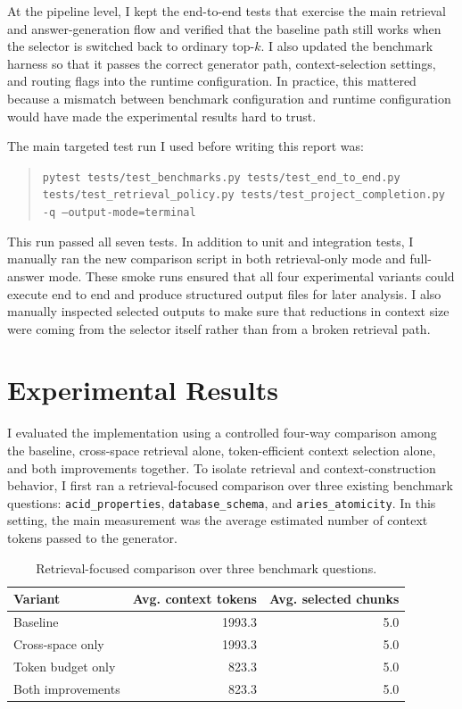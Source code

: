 \documentclass[10pt,twocolumn]{article}
\begin{document}
At the pipeline level, I kept the end-to-end tests that exercise the main retrieval and answer-generation flow and verified that the baseline path still works when the selector is switched back to ordinary top-$k$. I also updated the benchmark harness so that it passes the correct generator path, context-selection settings, and routing flags into the runtime configuration. In practice, this mattered because a mismatch between benchmark configuration and runtime configuration would have made the experimental results hard to trust.

The main targeted test run I used before writing this report was:
\begin{quote}\small
\texttt{pytest tests/test\_benchmarks.py tests/test\_end\_to\_end.py tests/test\_retrieval\_policy.py tests/test\_project\_completion.py -q --output-mode=terminal}
\end{quote}
This run passed all seven tests. In addition to unit and integration tests, I manually ran the new comparison script in both retrieval-only mode and full-answer mode. These smoke runs ensured that all four experimental variants could execute end to end and produce structured output files for later analysis. I also manually inspected selected outputs to make sure that reductions in context size were coming from the selector itself rather than from a broken retrieval path.

\section*{Experimental Results}
I evaluated the implementation using a controlled four-way comparison among the baseline, cross-space retrieval alone, token-efficient context selection alone, and both improvements together. To isolate retrieval and context-construction behavior, I first ran a retrieval-focused comparison over three existing benchmark questions: \texttt{acid\_properties}, \texttt{database\_schema}, and \texttt{aries\_atomicity}. In this setting, the main measurement was the average estimated number of context tokens passed to the generator.

\begin{table}[t]
\centering
\small
\begin{tabular}{lrr}
\toprule
Variant & Avg. context tokens & Avg. selected chunks \\
\midrule
Baseline & 1993.3 & 5.0 \\
Cross-space only & 1993.3 & 5.0 \\
Token budget only & 823.3 & 5.0 \\
Both improvements & 823.3 & 5.0 \\
\bottomrule
\end{tabular}
\caption{Retrieval-focused comparison over three benchmark questions.}
\end{table}
\end{document}
